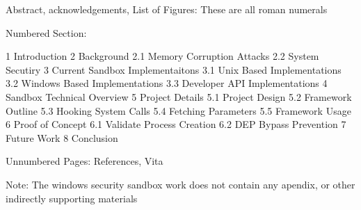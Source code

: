 Abstract, acknowledgements, List of Figures:  These are all roman numerals

Numbered Section:

1       Introduction
2       Background
2.1     Memory Corruption Attacks
2.2     System Secutiry
3       Current Sandbox Implementaitons
3.1     Unix Based Implementations
3.2     Windows Based Implementations
3.3     Developer API Implementations
4       Sandbox Technical Overview
5       Project Details
5.1     Project Design
5.2     Framework Outline
5.3     Hooking System Calls
5.4     Fetching Parameters
5.5     Framework Usage
6       Proof of Concept
6.1     Validate Process Creation
6.2     DEP Bypass Prevention
7       Future Work
8       Conclusion

Unnumbered Pages: References, Vita

Note: The windows security sandbox work does not contain any apendix, or other indirectly supporting materials
